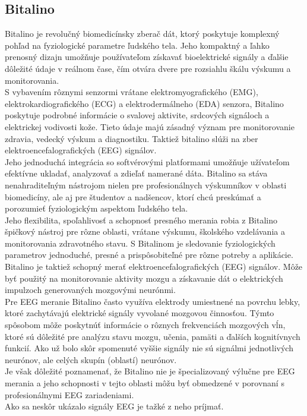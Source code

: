 \subsection{Bitalino}
\tab[5 mm] Bitalino je revolučný biomedicínsky zberač dát, ktorý poskytuje komplexný pohľad na fyziologické parametre ľudského tela. Jeho kompaktný a ľahko prenosný dizajn umožňuje používateľom získavať bioelektrické signály a ďalšie dôležité údaje v reálnom čase, čím otvára dvere pre rozsiahlu škálu výskumu a monitorovania.\\
\tab[5 mm] S vybavením rôznymi senzormi vrátane elektromyografického (EMG), elektrokardiografického (ECG) a elektrodermálneho (EDA) senzora, Bitalino poskytuje podrobné informácie o svalovej aktivite, srdcových signáloch a elektrickej vodivosti kože. Tieto údaje majú zásadný význam pre monitorovanie zdravia, vedecký výskum a diagnostiku. Taktiež bitalino slúži na zber elektroencefalografických (EEG) signálov.\\
\tab[5 mm] Jeho jednoduchá integrácia so softvérovými platformami umožňuje užívateľom efektívne ukladať, analyzovať a zdieľať namerané dáta. Bitalino sa stáva nenahraditeľným nástrojom nielen pre profesionálnych výskumníkov v oblasti biomedicíny, ale aj pre študentov a nadšencov, ktorí chcú preskúmať a porozumieť fyziologickým aspektom ľudského tela.\\
\tab[5 mm] Jeho flexibilita, spoľahlivosť a schopnosť presného merania robia z Bitalino špičkový nástroj pre rôzne oblasti, vrátane výskumu, školského vzdelávania a monitorovania zdravotného stavu. S Bitalinom je sledovanie fyziologických parametrov jednoduché, presné a prispôsobiteľné pre rôzne potreby a aplikácie.\\
\tab[5 mm] Bitalino je taktiež schopný merať elektroencefalografických (EEG) signálov. Môže byť použitý na monitorovanie aktivity mozgu a získavanie dát o elektrických impulzoch generovaných mozgovými neurónmi.\\
\tab[5 mm] Pre EEG meranie Bitalino často využíva elektrody umiestnené na povrchu lebky, ktoré zachytávajú elektrické signály vyvolané mozgovou činnosťou. Týmto spôsobom môže poskytnúť informácie o rôznych frekvenciách mozgových vĺn, ktoré sú dôležité pre analýzu stavu mozgu, učenia, pamäti a ďalších kognitívnych funkcií. Ako už bolo skôr spomenuté vyššie signály nie sú signálmi jednotlivých neurónov, ale celých skupín (oblastí) neurónov.\\
\tab[5 mm] Je však dôležité poznamenať, že Bitalino nie je špecializovaný výlučne pre EEG merania a jeho schopnosti v tejto oblasti môžu byť obmedzené v porovnaní s profesionálnymi EEG zariadeniami.\\
\tab[5 mm] Ako sa neskôr ukázalo signály EEG je tažké z neho príjmať.  
